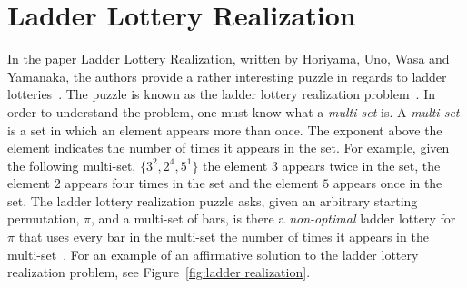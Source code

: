 

\section{Ladder Lottery Realization}

In the paper Ladder Lottery Realization, written by Horiyama, Uno, Wasa and Yamanaka, the authors provide 
a rather interesting puzzle in regards to ladder lotteries~\cite{A3}. The puzzle 
is known as the ladder lottery realization problem~\cite{A3}. In order to understand
the problem, one must know what a \emph{multi-set} is. A \emph{multi-set}
is a set in which an element appears more than once. The exponent 
above the element indicates the number of times it appears in the set.
For example, given the following multi-set, $\{3^{2}, 2^{4}, 5^{1}\}$ 
the element $3$ appears twice in the set, the element $2$ appears four times
in the set and the element $5$ appears once in the set.
The ladder lottery realization puzzle asks, given an arbitrary starting permutation, $\pi$, 
and a multi-set of bars, 
is there a \emph{non-optimal} ladder lottery for $\pi$
that uses every bar in the multi-set the number 
of times it appears in the  multi-set~\cite{A3}. 
For an example of an affirmative solution to the ladder lottery realization problem, see Figure~\ref{fig:ladder realization}.

